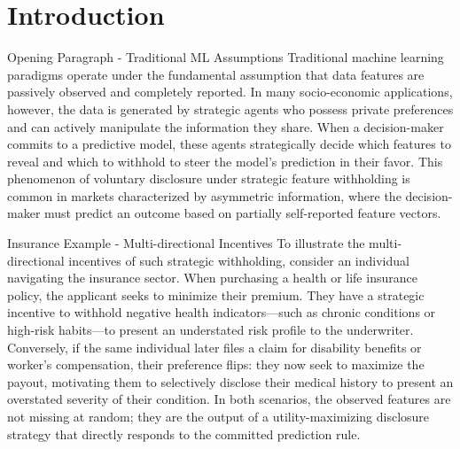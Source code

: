 \section{Introduction}
\label{sec:intro}

\begin{sourceblock}{Opening Paragraph - Traditional ML Assumptions}
Traditional machine learning paradigms operate under the fundamental assumption that data features are passively observed and completely reported. In many socio-economic applications, however, the data is generated by strategic agents who possess private preferences and can actively manipulate the information they share. When a decision-maker commits to a predictive model, these agents strategically decide which features to reveal and which to withhold to steer the model's prediction in their favor. This phenomenon of voluntary disclosure under strategic feature withholding is common in markets characterized by asymmetric information, where the decision-maker must predict an outcome based on partially self-reported feature vectors.
\end{sourceblock}

\begin{faqblock}
\faqanswers
{}
\end{faqblock}

\begin{sourceblock}{Insurance Example - Multi-directional Incentives}
To illustrate the multi-directional incentives of such strategic withholding, consider an individual navigating the insurance sector. When purchasing a health or life insurance policy, the applicant seeks to minimize their premium. They have a strategic incentive to withhold negative health indicators---such as chronic conditions or high-risk habits---to present an understated risk profile to the underwriter. Conversely, if the same individual later files a claim for disability benefits or worker's compensation, their preference flips: they now seek to maximize the payout, motivating them to selectively disclose their medical history to present an overstated severity of their condition. In both scenarios, the observed features are not missing at random; they are the output of a utility-maximizing disclosure strategy that directly responds to the committed prediction rule.
\end{sourceblock}

